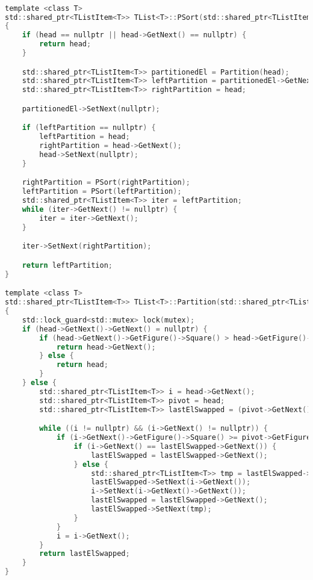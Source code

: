 \begin{lstlisting}[language=C]

template <class T>
std::shared_ptr<TListItem<T>> TList<T>::PSort(std::shared_ptr<TListItem<T>> &head)
{
    if (head == nullptr || head->GetNext() == nullptr) {
        return head;
    }

    std::shared_ptr<TListItem<T>> partitionedEl = Partition(head);
    std::shared_ptr<TListItem<T>> leftPartition = partitionedEl->GetNext();
    std::shared_ptr<TListItem<T>> rightPartition = head;

    partitionedEl->SetNext(nullptr);

    if (leftPartition == nullptr) {
        leftPartition = head;
        rightPartition = head->GetNext();
        head->SetNext(nullptr);
    }

    rightPartition = PSort(rightPartition);
    leftPartition = PSort(leftPartition);
    std::shared_ptr<TListItem<T>> iter = leftPartition;
    while (iter->GetNext() != nullptr) {
        iter = iter->GetNext();
    }

    iter->SetNext(rightPartition);

    return leftPartition;
}

template <class T>
std::shared_ptr<TListItem<T>> TList<T>::Partition(std::shared_ptr<TListItem<T>> &head)
{
    std::lock_guard<std::mutex> lock(mutex);
    if (head->GetNext()->GetNext() = nullptr) {
        if (head->GetNext()->GetFigure()->Square() > head->GetFigure()->Square()) {
            return head->GetNext();
        } else {
            return head;
        }
    } else {
        std::shared_ptr<TListItem<T>> i = head->GetNext();
        std::shared_ptr<TListItem<T>> pivot = head;
        std::shared_ptr<TListItem<T>> lastElSwapped = (pivot->GetNext()->GetFigure()->Square() >= pivot->GetFigure()->Square()) ? pivot->GetNext() : pivot;

        while ((i != nullptr) && (i->GetNext() != nullptr)) {
            if (i->GetNext()->GetFigure()->Square() >= pivot->GetFigure()->Square()) {
                if (i->GetNext() == lastElSwapped->GetNext()) {
                    lastElSwapped = lastElSwapped->GetNext();
                } else {
                    std::shared_ptr<TListItem<T>> tmp = lastElSwapped->GetNext();
                    lastElSwapped->SetNext(i->GetNext());
                    i->SetNext(i->GetNext()->GetNext());
                    lastElSwapped = lastElSwapped->GetNext();
                    lastElSwapped->SetNext(tmp);
                }
            }
            i = i->GetNext();
        }
        return lastElSwapped;
    }
}


\end{lstlisting}
